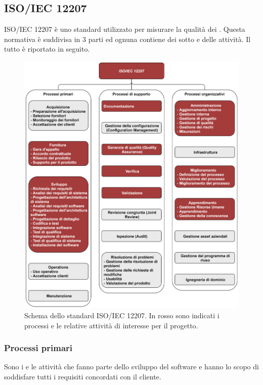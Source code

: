 \subsection{ISO/IEC 12207}
ISO/IEC 12207 è uno standard utilizzato per misurare la qualità dei . Questa normativa è suddivisa in 3 parti
ed ognuna contiene dei sotto  e delle attività. Il tutto è riportato in seguito. 

\begin{figure}[h]
    \centering
    \includegraphics[scale=0.53]{Immagini/IsoIec12207.png}
    \caption{Schema dello standard ISO/IEC 12207. In rosso sono indicati i processi e le relative attività di interesse per il progetto.}
\end{figure}

\subsubsection{Processi primari}
Sono i  e le attività che fanno parte dello sviluppo del software e hanno lo scopo di soddisfare tutti i requisiti concordati con il cliente.

